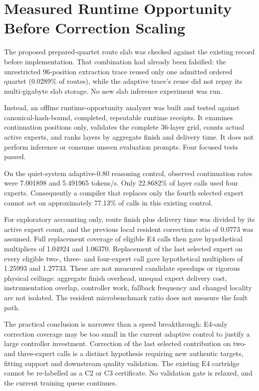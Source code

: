 \section{Measured Runtime Opportunity Before Correction Scaling}
The proposed prepared-quartet route slab was checked against the existing
record before implementation. That combination had already been falsified:
the unrestricted 96-position extraction trace reused only one admitted ordered
quartet (0.0289\% of routes), while the adaptive trace's reuse did not repay
its multi-gigabyte slab storage. No new slab inference experiment was run.

Instead, an offline runtime-opportunity analyzer was built and tested against
canonical-hash-bound, completed, repeatable runtime receipts. It examines
continuation positions only, validates the complete 36-layer grid, counts
actual active experts, and ranks layers by aggregate finish and delivery
time. It does not perform inference or consume unseen evaluation prompts.
Four focused tests passed.

On the quiet-system adaptive-0.80 reasoning control, observed continuation
rates were 7.001898 and 5.491965 tokens/s. Only 22.8682\% of layer calls used
four experts. Consequently a compiler that replaces only the fourth selected
expert cannot act on approximately 77.13\% of calls in this existing control.

For exploratory accounting only, route finish plus delivery time was divided
by its active expert count, and the previous local resident correction ratio
of 0.0773 was assumed. Full replacement coverage of eligible E4 calls then
gave hypothetical multipliers of 1.04924 and 1.06370. Replacement of the last
selected expert on every eligible two-, three- and four-expert call gave
hypothetical multipliers of 1.25993 and 1.27733. These are not measured
candidate speedups or rigorous physical ceilings: aggregate finish overhead,
unequal expert delivery cost, instrumentation overlap, controller work,
fallback frequency and changed locality are not isolated. The resident
microbenchmark ratio does not measure the fault path.

The practical conclusion is narrower than a speed breakthrough: E4-only
correction coverage may be too small in the current adaptive control to
justify a large controller investment. Correction of the last selected
contribution on two- and three-expert calls is a distinct hypothesis requiring
new authentic targets, fitting support and downstream quality validation.
The existing E4 cartridge cannot be re-labelled as a C2 or C3 certificate.
No validation gate is relaxed, and the current training queue continues.

